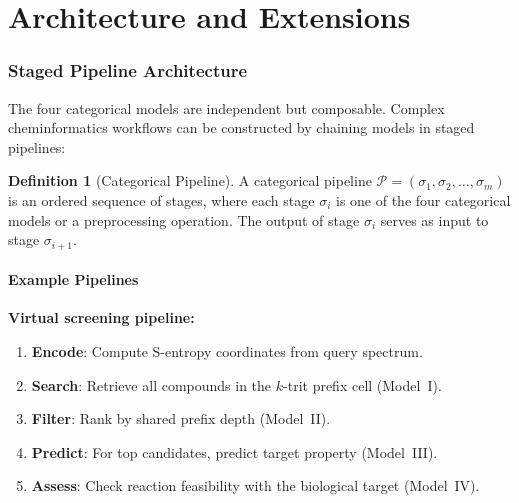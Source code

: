 \documentclass[11pt,twocolumn,a4paper]{article}
\theoremstyle{definition}
\newtheorem{definition}[theorem]{Definition}
\theoremstyle{remark}
\newcommand{\Pipeline}{\mathcal{P}}
\begin{document}

\part{Architecture and Extensions}

\section{Staged Pipeline Architecture}
\label{sec:staged_architecture}

The four categorical models are independent but composable. Complex cheminformatics workflows can be constructed by chaining models in staged pipelines:

\begin{definition}[Categorical Pipeline]
\label{def:pipeline}
A categorical pipeline $\Pipeline = (\sigma_1, \sigma_2, \ldots, \sigma_m)$ is an ordered sequence of stages, where each stage $\sigma_i$ is one of the four categorical models or a preprocessing operation. The output of stage $\sigma_i$ serves as input to stage $\sigma_{i+1}$.
\end{definition}

\subsection{Example Pipelines}

\textbf{Virtual screening pipeline:}
\begin{enumerate}[nosep]
\item \textbf{Encode}: Compute S-entropy coordinates from query spectrum.
\item \textbf{Search}: Retrieve all compounds in the $k$-trit prefix cell (Model~I).
\item \textbf{Filter}: Rank by shared prefix depth (Model~II).
\item \textbf{Predict}: For top candidates, predict target property (Model~III).
\item \textbf{Assess}: Check reaction feasibility with the biological target (Model~IV).
\end{enumerate}
\end{document}
